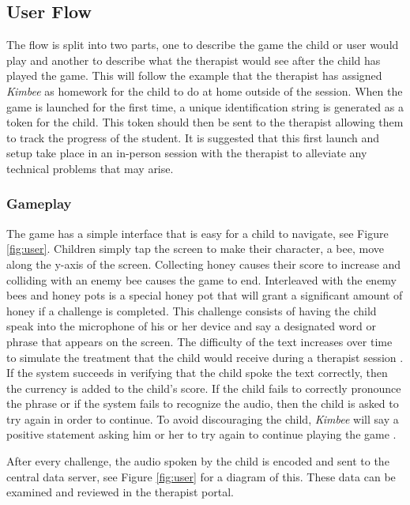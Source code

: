 \documentclass{sig-alternate-2013}
\begin{document}
\subsection{User Flow}

The flow is split into two parts, one to describe the game the child or user would play and another to describe what the therapist would see after the child has played the game. This will follow the example that the therapist has assigned {\em Kimbee} as homework for the child to do at home outside of the session. When the game is launched for the first time, a unique identification string is generated as a token for the child. This token should then be sent to the therapist allowing them to track the progress of the student. It is suggested that this first launch and setup take place in an in-person session with the therapist to alleviate any technical problems that may arise.

\subsubsection{Gameplay}

The game has a simple interface that is easy for a child to navigate, see Figure \ref{fig:user}. Children simply tap the screen to make their character, a bee, move along the y-axis of the screen. Collecting honey causes their score to increase and colliding with an enemy bee causes the game to end. Interleaved with the enemy bees and honey pots is a special honey pot that will grant a significant amount of honey if a challenge is completed. This challenge consists of having the child speak into the microphone of his or her device and say a designated word or phrase that appears on the screen. The difficulty of the text increases over time to simulate the treatment that the child would receive during a therapist session \cite{Rosenbek:Treatment}. If the system succeeds in verifying that the child spoke the text correctly, then the currency is added to the child's score. If the child fails to correctly pronounce the phrase or if the system fails to recognize the audio, then the child is asked to try again in order to continue. To avoid discouraging the child, {\em Kimbee} will say a positive statement asking him or her to try again to continue playing the game \cite{Kreider:Intro}.

After every challenge, the audio spoken by the child is encoded and sent to the central data server, see Figure \ref{fig:user} for a diagram of this. These data can be examined and reviewed in the therapist portal.
\end{document}
